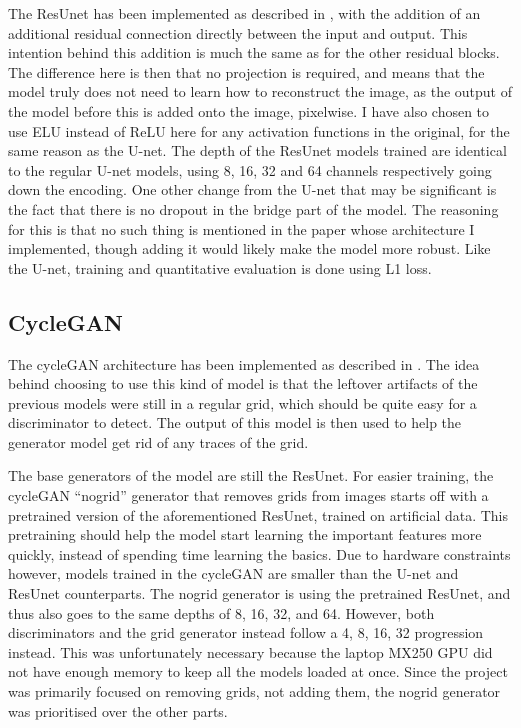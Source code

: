 The ResUnet has been implemented as described in \cite{resunet}, with the addition of an additional residual connection directly between the input and output. This intention behind this addition is much the same as for the other residual blocks. The difference here is then that no projection is required, and means that the model truly does not need to learn how to reconstruct the image, as the output of the model before this is added onto the image, pixelwise. I have also chosen to use ELU instead of ReLU here for any activation functions in the original, for the same reason as the U-net. The depth of the ResUnet models trained are identical to the regular U-net models, using 8, 16, 32 and 64 channels respectively going down the encoding. One other change from the U-net that may be significant is the fact that there is no dropout in the bridge part of the model. The reasoning for this is that no such thing is mentioned in the paper whose architecture I implemented, though adding it would likely make the model more robust. Like the U-net, training and quantitative evaluation is done using L1 loss.

\subsection{CycleGAN}
The cycleGAN architecture has been implemented as described in \cite{cyclegan}. The idea behind choosing to use this kind of model is that the leftover artifacts of the previous models were still in a regular grid, which should be quite easy for a discriminator to detect. The output of this model is then used to help the generator model get rid of any traces of the grid.

The base generators of the model are still the ResUnet. For easier training, the cycleGAN ``nogrid'' generator that removes grids from images starts off with a pretrained version of the aforementioned ResUnet, trained on artificial data. This pretraining should help the model start learning the important features more quickly, instead of spending time learning the basics. Due to hardware constraints however, models trained in the cycleGAN are smaller than the U-net and ResUnet counterparts. The nogrid generator is using the pretrained ResUnet, and thus also goes to the same depths of 8, 16, 32, and 64. However, both discriminators and the grid generator instead follow a 4, 8, 16, 32 progression instead. This was unfortunately necessary because the laptop MX250 GPU did not have enough memory to keep all the models loaded at once. Since the project was primarily focused on removing grids, not adding them, the nogrid generator was prioritised over the other parts.

